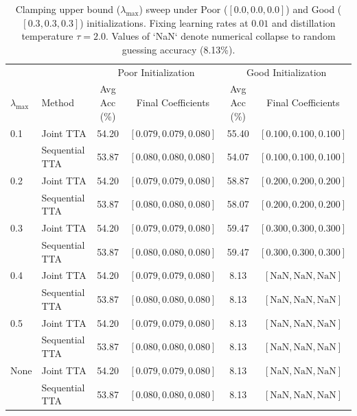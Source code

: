 \documentclass{article}
\theoremstyle{plain}
\theoremstyle{definition}
\theoremstyle{remark}
\begin{document}
\begin{table}[t]
\caption{Clamping upper bound ($\lambda_{\max}$) sweep under Poor ($[0.0,0.0,0.0]$) and Good ($[0.3,0.3,0.3]$) initializations. Fixing learning rates at $0.01$ and distillation temperature $\tau=2.0$. Values of `NaN` denote numerical collapse to random guessing accuracy (8.13\%).}
\label{tab:clamp_sweep}
\vskip 0.08in
\begin{center}
\begin{small}
\begin{sc}
\begin{tabular}{llcccc}
\toprule
& & \multicolumn{2}{c}{Poor Initialization} & \multicolumn{2}{c}{Good Initialization} \\
$\lambda_{\max}$ & Method & Avg Acc (\%) & Final Coefficients & Avg Acc (\%) & Final Coefficients \\
\midrule
0.1 & Joint TTA & 54.20 & $[0.079, 0.079, 0.080]$ & 55.40 & $[0.100, 0.100, 0.100]$ \\
    & Sequential TTA & 53.87 & $[0.080, 0.080, 0.080]$ & 54.07 & $[0.100, 0.100, 0.100]$ \\
\midrule
0.2 & Joint TTA & 54.20 & $[0.079, 0.079, 0.080]$ & 58.87 & $[0.200, 0.200, 0.200]$ \\
    & Sequential TTA & 53.87 & $[0.080, 0.080, 0.080]$ & 58.07 & $[0.200, 0.200, 0.200]$ \\
\midrule
0.3 & Joint TTA & 54.20 & $[0.079, 0.079, 0.080]$ & 59.47 & $[0.300, 0.300, 0.300]$ \\
    & Sequential TTA & 53.87 & $[0.080, 0.080, 0.080]$ & 59.47 & $[0.300, 0.300, 0.300]$ \\
\midrule
0.4 & Joint TTA & 54.20 & $[0.079, 0.079, 0.080]$ & 8.13 & $[\text{NaN}, \text{NaN}, \text{NaN}]$ \\
    & Sequential TTA & 53.87 & $[0.080, 0.080, 0.080]$ & 8.13 & $[\text{NaN}, \text{NaN}, \text{NaN}]$ \\
\midrule
0.5 & Joint TTA & 54.20 & $[0.079, 0.079, 0.080]$ & 8.13 & $[\text{NaN}, \text{NaN}, \text{NaN}]$ \\
    & Sequential TTA & 53.87 & $[0.080, 0.080, 0.080]$ & 8.13 & $[\text{NaN}, \text{NaN}, \text{NaN}]$ \\
\midrule
None & Joint TTA & 54.20 & $[0.079, 0.079, 0.080]$ & 8.13 & $[\text{NaN}, \text{NaN}, \text{NaN}]$ \\
    & Sequential TTA & 53.87 & $[0.080, 0.080, 0.080]$ & 8.13 & $[\text{NaN}, \text{NaN}, \text{NaN}]$ \\
\bottomrule
\end{tabular}
\end{sc}
\end{small}
\end{center}
\vskip -0.1in
\end{table}
\end{document}
